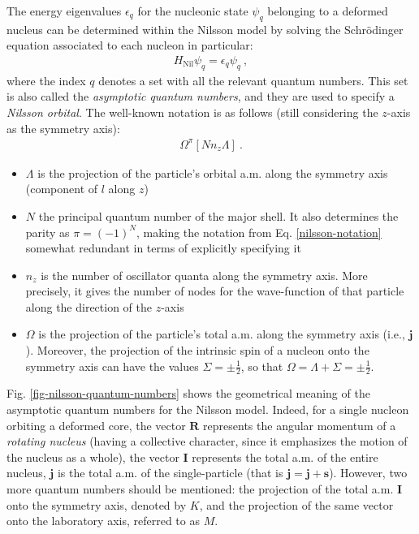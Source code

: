 The energy eigenvalues $\epsilon_q$ for the nucleonic state $\psi_q$ belonging to a deformed nucleus can be determined within the Nilsson model by solving the Schrödinger equation associated to each nucleon in particular:
\begin{align}
    H_\text{Nil}\psi_q=\epsilon_q\psi_q\ ,
    \label{nilsson-schrodiner-equation}
\end{align}
where the index $q$ denotes a set with all the relevant quantum numbers. This set is also called the \emph{asymptotic quantum numbers}, and they are used to specify a \emph{Nilsson orbital}. The well-known notation is as follows (still considering the $z$-axis as the symmetry axis):
\begin{align}
    \Omega^\pi\left[Nn_z\Lambda\right]\ .
    \label{nilsson-notation}
\end{align}
\begin{itemize}
    \item $\Lambda$ is the projection of the particle's orbital a.m. along the symmetry axis (component of $l$ along $z$)
    \item $N$ the principal quantum number of the major shell. It also determines the parity as $\pi=(-1)^N$, making the notation from Eq. \ref{nilsson-notation} somewhat redundant in terms of explicitly specifying it
    \item $n_z$ is the number of oscillator quanta along the symmetry axis. More precisely, it gives the number of nodes for the wave-function of that particle along the direction of the $z$-axis
    \item $\Omega$ is the projection of the particle's total a.m. along the symmetry axis (i.e., $\mathbf{j}$). Moreover, the projection of the intrinsic spin of a nucleon onto the symmetry axis can have the values $\Sigma=\pm\frac{1}{2}$, so that $\Omega=\Lambda+\Sigma=\pm\frac{1}{2}$.
\end{itemize}

Fig. \ref{fig-nilsson-quantum-numbers} shows the geometrical meaning of the asymptotic quantum numbers for the Nilsson model. Indeed, for a single nucleon orbiting a deformed core, the vector $\mathbf{R}$ represents the angular momentum of a \emph{rotating nucleus} (having a collective character, since it emphasizes the motion of the nucleus as a whole), the vector $\mathbf{I}$ represents the total a.m. of the entire nucleus, $\mathbf{j}$ is the total a.m. of the single-particle (that is $\mathbf{j}=\mathbf{j}+\mathbf{s}$). However, two more quantum numbers should be mentioned: the projection of the total a.m. $\mathbf{I}$ onto the symmetry axis, denoted by $K$, and the projection of the same vector onto the laboratory axis, referred to as $M$.

